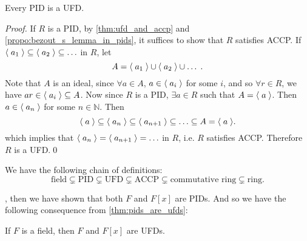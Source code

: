 \begin{thm}
\label{thm:pids_are_ufds}
  Every PID is a UFD.
\end{thm}

\begin{proof}
  If $R$ is a PID, by \cref{thm:ufd_and_accp} and \cref{propo:bezout_s_lemma_in_pids}, it suffices to show that $R$ satisfies ACCP. If $\langle \; a_1 \; \rangle \subseteq \langle \; a_2 \; \rangle \subseteq \hdots$ in $R$, let
  \begin{equation*}
    A = \langle \; a_1 \; \rangle \cup \langle \; a_2 \; \rangle \cup \hdots \;.
  \end{equation*}
  Note that $A$ is an ideal, since $\forall a \in A$, $a \in \langle \; a_i \; \rangle$ for some $i$, and so $\forall r \in R$, we have $ar \in \langle \; a_i \; \rangle \subseteq A$. Now since $R$ is a PID, $\exists a \in R$ such that $A = \langle \; a \; \rangle$. Then $a \in \langle \; a_n \; \rangle$ for some $n \in \mathbb{N}$. Then
  \begin{equation*}
    \langle \; a \; \rangle \subseteq \langle \; a_n \; \rangle \subseteq \langle \; a_{n + 1} \; \rangle \subseteq \hdots \subseteq A = \langle \; a \; \rangle.
  \end{equation*}
  which implies that $\langle \; a_n \; \rangle = \langle \; a_{n + 1} \; \rangle = \hdots$ in $R$, i.e. $R$ satisfies ACCP. Therefore $R$ is a UFD.\qed
\end{proof}

\begin{note}\label{note:chain_of_definitions}
  We have the following chain of definitions:
  \begin{equation*}
    \text{field} \subsetneq \text{PID} \subsetneq \text{UFD} \subsetneq \text{ACCP} \subsetneq \text{commutative ring} \subsetneq \text{ring}.
  \end{equation*}
\end{note}

, then we have shown that both $F$ and $F[x]$ are PIDs. And so we have the following consequence from \cref{thm:pids_are_ufds}:

\begin{crly}
\label{crly:polynomial_rings_over_a_field_is_a_ufd}
If $F$ is a field, then $F$ and $F[x]$ are UFDs.
\end{crly}

